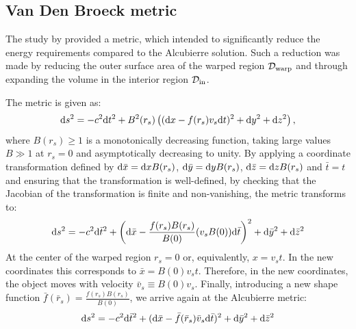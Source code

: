 \documentclass[10pt]{iopart}
\begin{document}
\subsection{Van Den Broeck metric}

The study by \cite{vandenBroeck1999} provided a metric, which intended to significantly reduce the energy requirements compared to the Alcubierre solution. Such a reduction was made by reducing the outer surface area of the warped region $\mathcal{D}_{\rm warp}$ and through expanding the volume in the interior region $\mathcal{D}_{\rm in}$. 

The \cite{vandenBroeck1999} metric is given as:
\begin{equation}
{\rm d}s^2= -c^2 {\rm d} t^2 + B^2(r_s)\left(({\rm d}x-f(r_s)v_s {\rm d}t)^2+{\rm d}y^2 + {\rm d}z^2\right),
\label{eq:vandenBroeck}
\end{equation}
where $B(r_s)\geq 1$ is a monotonically decreasing function, taking large values $B\gg 1$ at $r_s=0$ and asymptotically decreasing to unity. By applying a coordinate transformation defined by ${\rm d}{\bar{x}} = {\rm d}{x}B(r_s)$, ${\rm d}{\bar{y}} = {\rm d}{y}B(r_s)$, ${\rm d}{\bar{z}} = {\rm d}{z}B(r_s)$ and $\bar{t}=t$ and ensuring that the transformation is well-defined, by checking that the Jacobian of the transformation is finite and non-vanishing, the metric transforms to:
\begin{equation}
{\rm d}s^2= -c^2 {\rm d} \bar{t}^2 + \left({\rm d}\bar{x}-\frac{f(r_s)B(r_s)}{B(0)}(v_s B(0)){\rm d}\bar{t}\right)^2+{\rm d}\bar{y}^2 + {\rm d}\bar{z}^2
\label{eq:vandenBroeck2}
\end{equation}
At the center of the warped region $r_s=0$ or, equivalently, $x=v_s t$. In the new coordinates this corresponds to $\bar{x}=B(0)v_s t$. Therefore, in the new coordinates, the object moves with velocity $\bar{v}_s\equiv B(0)v_s$. Finally, introducing a new shape function $\bar{f}(\bar{r}_s)=\frac{f(r_s)B(r_s)}{B(0)}$, we arrive again at the Alcubierre metric:
\begin{equation}
{\rm d}s^2= -c^2 {\rm d} \bar{t}^2 + ({\rm d}\bar{x}-\bar{f}(\bar{r}_s)\bar{v}_s{\rm d}\bar{t})^2+{\rm d}\bar{y}^2 + {\rm d}\bar{z}^2
    \label{eq:vandenBroeck3}
\end{equation}
\end{document}

